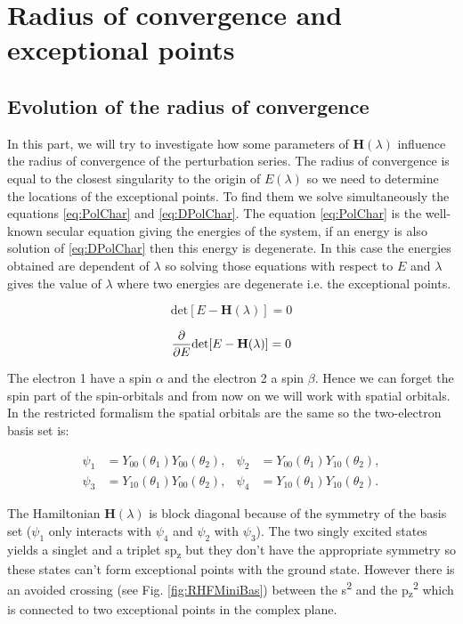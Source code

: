 \documentclass[11pt,a4paper]{article}
\newcommand{\bH}{\mathbf{H}}
\begin{document}
\section{Radius of convergence and exceptional points}

\subsection{Evolution of the radius of convergence}

In this part, we will try to investigate how some parameters of $\bH(\lambda)$ influence the radius of convergence of the perturbation series. The radius of convergence is equal to the closest singularity to the origin of $E(\lambda)$ so we need to determine the locations of the exceptional points. To find them we solve simultaneously the equations \eqref{eq:PolChar} and \eqref{eq:DPolChar}. The equation \eqref{eq:PolChar} is the well-known secular equation giving the energies of the system, if an energy is also solution of \eqref{eq:DPolChar} then this energy is degenerate. In this case the energies obtained are dependent of $\lambda$ so solving those equations with respect to $E$ and $\lambda$ gives the value of $\lambda$ where two energies are degenerate i.e. the exceptional points.


\begin{equation}\label{eq:PolChar}
\text{det}[E-\bH(\lambda)]=0
\end{equation}

\begin{equation}\label{eq:DPolChar}
\pdv{E}\text{det}[E-\bH(\lambda)]=0
\end{equation}

The electron 1 have a spin $\alpha$ and the electron 2 a spin $\beta$. Hence we can forget the spin part of the spin-orbitals and from now on we will work with spatial orbitals. In the restricted formalism the spatial orbitals are the same so the two-electron basis set is:

\begin{align}\label{eq:rhfbasis}
 \psi_1 & =Y_{00}(\theta_1)Y_{00}(\theta_2),
 & 
 \psi_2 & =Y_{00}(\theta_1)Y_{10}(\theta_2),\\
 \psi_3 & =Y_{10}(\theta_1)Y_{00}(\theta_2),
 & 
 \psi_4 & =Y_{10}(\theta_1)Y_{10}(\theta_2).
\end{align}

The Hamiltonian $\bH(\lambda)$ is block diagonal because of the symmetry of the basis set ($\psi_1$ only interacts with $\psi_4$ and $\psi_2$ with $\psi_3$). The two singly excited states yields a singlet and a triplet sp\textsubscript{z} but they don't have the appropriate symmetry so these states can't form exceptional points with the ground state. However there is an avoided crossing (see Fig. \ref{fig:RHFMiniBas}) between the s\textsuperscript{2} and the p\textsubscript{z}\textsuperscript{2} which is connected to two exceptional points in the complex plane. 
\end{document}
